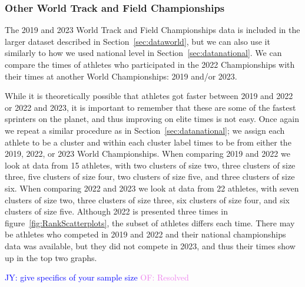 \documentclass[12pt, letterpaper, titlepage]{article}
\newcommand{\jy}[1]{\textcolor{blue}{JY: #1}}
\newcommand{\of}[1]{\textcolor{violet}{OF: #1}}
\begin{document}
\subsubsection{Other World Track and Field Championships}\label{sec:data2019}
The 2019 and 2023 World Track and Field Championships data is included in the 
larger dataset described in Section~\ref{sec:dataworld}, but we can also use it
similarly to how we used national level in Section~\ref{sec:datanational}.  We
can compare the times of athletes who participated in the 2022 Championships with
their times at another World Championships: 2019 and/or 2023.

While it is theoretically possible that athletes got faster 
between 2019 and 2022 or 2022 and 2023, it is important to 
remember that these are some of the fastest sprinters on the planet, and thus
improving on elite times is not easy.  Once again we repeat a similar procedure
as in Section~\ref{sec:datanational}; we assign each athlete to be a cluster and
within each cluster label times to be from either the 2019, 2022, or 2023 World
Championships. When comparing 2019 and 2022 we look at data from 15
athletes, with two clusters of size two, three clusters of size three, five 
clusters of size four, two clusters of size five, and three clusters of size six.
When comparing 2022 and 2023 we look at data from 22 athletes, with seven 
clusters of size two, three clusters of size three, six clusters of size four,
and six clusters of size five.  Although 2022 is presented three times in
figure~\ref{fig:RankScatterplots}, the subset of athletes differs each time.
There may be athletes who competed in 2019 and 2022 and their national
championships data was available, but they did not compete in 2023, and thus their
times show up in the top two graphs.

\jy{give specifics of your sample size}
\of{Resolved}
\end{document}
